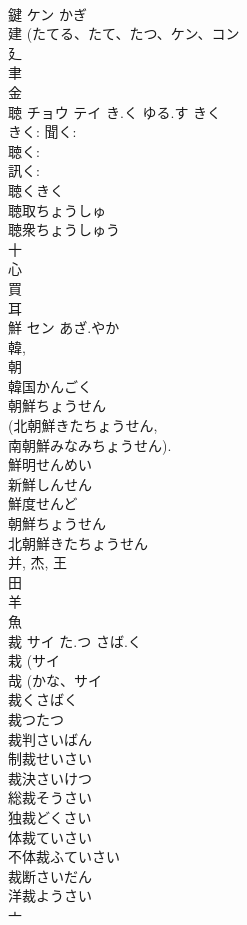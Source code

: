\documentclass[8pt]{extreport}
\begin{document}
\begin{CJK}{UTF8}{min}
\\	鍵	ケン	かぎ	
\\	建 (たてる、たて、たつ、ケン、コン 
\\	廴 
\\	聿 
\\	金 
\\	聴	チョウ テイ	き.く ゆる.す きく	
\\	きく: 聞く: 
\\	聴く: 
\\	訊く: 
\\	聴くきく
\\	聴取ちょうしゅ
\\	聴衆ちょうしゅう
\\	十 
\\	心 
\\	買 
\\	耳 
\\	鮮	セン	あざ.やか	
\\	韓, 
\\	朝 
\\	韓国かんごく 
\\	朝鮮ちょうせん 
\\	(北朝鮮きたちょうせん, 
\\	南朝鮮みなみちょうせん).
\\	鮮明せんめい 
\\	新鮮しんせん 
\\	鮮度せんど 
\\	朝鮮ちょうせん 
\\	北朝鮮きたちょうせん 
\\	并, 杰, 王 
\\	田 
\\	羊 
\\	魚 
\\	裁	サイ	た.つ さば.く	
\\	栽 (サイ 
\\	哉 (かな、サイ 
\\	裁くさばく
\\	裁つたつ
\\	裁判さいばん
\\	制裁せいさい
\\	裁決さいけつ
\\	総裁そうさい
\\	独裁どくさい
\\	体裁ていさい
\\	不体裁ふていさい
\\	裁断さいだん
\\	洋裁ようさい
\\	亠 

\end{CJK}
\end{document}
